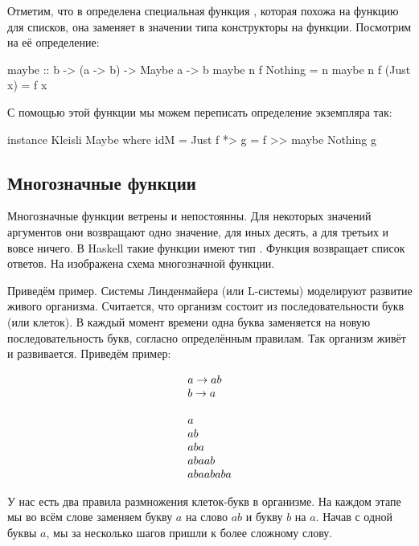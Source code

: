 Отметим, что в 
определена специальная функция , которая
похожа на функцию  для списков, она заменяет
в значении типа  конструкторы на функции. 
Посмотрим на её определение:

\begin{code}
maybe              :: b -> (a -> b) -> Maybe a -> b
maybe n f Nothing  =  n
maybe n f (Just x) =  f x
\end{code}

С помощью этой функции мы можем переписать определение
экземпляра  так:

\begin{code}
instance Kleisli Maybe where
    idM     = Just
    f *> g  = f >> maybe Nothing g
\end{code}

\subsection{Многозначные функции}

Многозначные функции ветрены и непостоянны. Для некоторых
значений аргументов они возвращают одно значение, для иных
десять, а для третьих и вовсе ничего. В Haskell такие
функции имеют тип . Функция возвращает список 
ответов. На  изображена схема многозначной
функции.


Приведём пример. 
Системы Линденмайера (или L-системы) моделируют развитие живого организма.
Считается, что организм состоит из последовательности букв (или клеток).
В каждый момент времени одна буква заменяется на 
новую последовательность букв, согласно определённым правилам. 
Так организм живёт и развивается. Приведём пример:

\[\begin{array}{l}
    a \rightarrow ab \\
    b \rightarrow a \\
    \\
    a \\
    ab \\
    aba \\
    abaab \\
    abaababa \\
\end{array}\]

У нас есть два правила размножения клеток-букв в организме.
На каждом этапе мы во всём слове заменяем букву $a$ на слово $ab$ и букву
$b$ на $a$. Начав с одной буквы $a$, мы за несколько шагов
пришли к более сложному слову.

